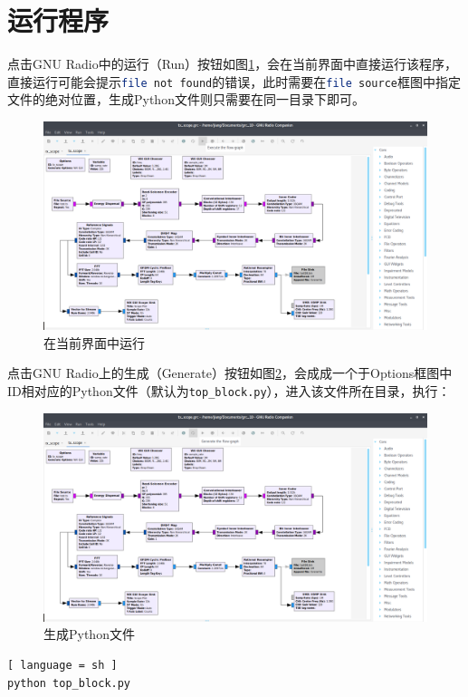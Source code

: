 	\section{运行程序}
		\par 点击GNU Radio中的运行（Run）按钮如图\ref{fig:dvbt_run}，会在当前界面中直接运行该程序，直接运行可能会提示\lstinline[language=sh]{file not found}的错误，此时需要在\lstinline[language=sh]{file source}框图中指定文件的绝对位置，生成Python文件则只需要在同一目录下即可。
		\begin{figure}[htp]
			\centering
			\includegraphics[width=13cm]{figures/dvbt_run.png}
			\caption{在当前界面中运行}
			\label{fig:dvbt_run}
		\end{figure}
		\par 点击GNU Radio上的生成（Generate）按钮如图\ref{fig:dvbt_generate}，会成成一个于Options框图中ID相对应的Python文件（默认为\lstinline[language=sh]{top_block.py}），进入该文件所在目录，执行：
		\begin{figure}[htp]
			\centering
			\includegraphics[width=13cm]{figures/dvbt_generate.png}
			\caption{生成Python文件}
			\label{fig:dvbt_generate}
		\end{figure}	
		\begin{lstlisting}[ language = sh ]
python top_block.py
		\end{lstlisting}
